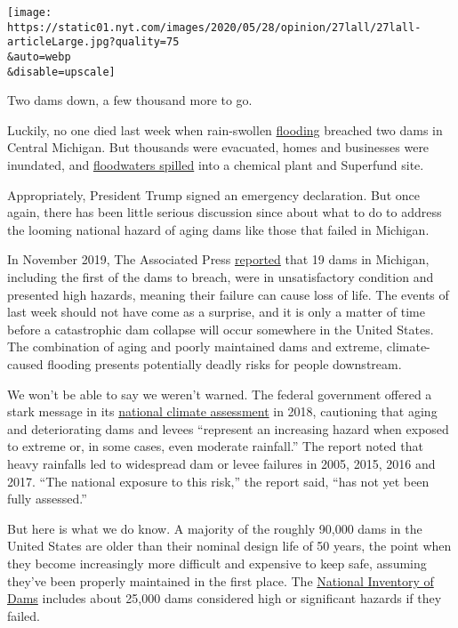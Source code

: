 \texttt{[image: https://static01.nyt.com/images/2020/05/28/opinion/27lall/27lall-articleLarge.jpg?quality=75\\\&auto=webp\\\&disable=upscale]}

Two dams down, a few thousand more to go.

Luckily, no one died last week when rain-swollen
\href{https://www.nytimes.com/interactive/2020/06/29/climate/hidden-flood-risk-maps.html}{flooding}
breached two dams in Central Michigan. But thousands were evacuated,
homes and businesses were inundated, and
\href{https://www.nytimes.com/reuters/2020/05/21/us/21reuters-usa-flood-michigan.html}{floodwaters
spilled} into a chemical plant and Superfund site.

Appropriately, President Trump signed an emergency declaration. But once
again, there has been little serious discussion since about what to do
to address the looming national hazard of aging dams like those that
failed in Michigan.

In November 2019, The Associated Press
\href{https://apnews.com/f5f09a300d394900a1a88362238dbf77}{reported}
that 19 dams in Michigan, including the first of the dams to breach,
were in unsatisfactory condition and presented high hazards, meaning
their failure can cause loss of life. The events of last week should not
have come as a surprise, and it is only a matter of time before a
catastrophic dam collapse will occur somewhere in the United States. The
combination of aging and poorly maintained dams and extreme,
climate-caused flooding presents potentially deadly risks for people
downstream.

We won't be able to say we weren't warned. The federal government
offered a stark message in its
\href{https://nca2018.globalchange.gov/chapter/3/}{national climate
assessment} in 2018, cautioning that aging and deteriorating dams and
levees ``represent an increasing hazard when exposed to extreme or, in
some cases, even moderate rainfall.'' The report noted that heavy
rainfalls led to widespread dam or levee failures in 2005, 2015, 2016
and 2017. ``The national exposure to this risk,'' the report said, ``has
not yet been fully assessed.''

But here is what we do know. A majority of the roughly 90,000 dams in
the United States are older than their nominal design life of 50 years,
the point when they become increasingly more difficult and expensive to
keep safe, assuming they've been properly maintained in the first place.
The \href{https://nid.sec.usace.army.mil/ords/f?p=105:1::::::}{National
Inventory of Dams} includes about 25,000 dams considered high or
significant hazards if they failed.


